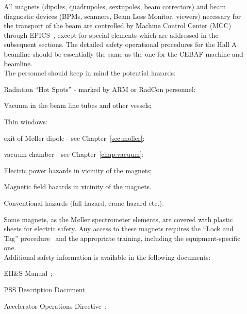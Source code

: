 All magnets (dipoles, quadrupoles, sextupoles, beam correctors) and beam 
diagnostic devices (BPMs, scanners, Beam Loss Monitor, viewers) necessary for 
the transport of the beam are controlled by Machine Control Center (MCC) 
through EPICS~\cite{EPICSwww}, except for special elements which are addressed in the 
subsequent sections. The detailed safety operational procedures for the Hall 
A beamline should be essentially the same as the one for the CEBAF machine 
and beamline.\\ 

\noindent{}The personnel should keep in mind the potential hazards:
\begin{list}{.~}{\setlength{\itemsep}{-0.15cm}}
  \item Radiation ``Hot Spots'' - marked by ARM or RadCon personnel;
  \item Vacuum in the beam line tubes and other vessels;
  \item Thin windows:
    \begin{list}{--}{\setlength{\itemsep}{-0.15cm}}
      \item exit of M{\o}ller dipole - see Chapter~\ref{sec:moller}; 
      \item vacuum chamber - see Chapter~\ref{chap:vacuum};
    \end{list}
  \item Electric power hazards in vicinity of the magnets; 
  \item Magnetic field hazards in vicinity of the magnets. 
  \item Conventional hazards (fall hazard, crane hazard etc.).
\end{list}
Some magnets, as the M{\o}ller spectrometer elements, are covered with plastic
sheets for electric safety. Any access to these magnets requires
the ``Lock and Tag'' procedure~\cite{EHScebaf} and the appropriate training,
including the equipment-specific one. \\

\noindent{}Additional safety information is available in the following documents:
\begin{list}{--}{\setlength{\itemsep}{-0.15cm}}
  \item EH\&S Manual~\cite{EHScebaf};
  \item PSS Description Document~\cite{PSScebaf}
  \item Accelerator Operations Directive~\cite{AODcebaf};
\end{list}

